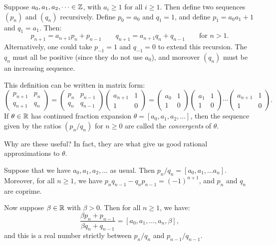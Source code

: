 \documentclass{article}
\begin{document}
\begin{definition}[Convergents]
	\label{convergents-definition}
    Suppose $a_0, a_1, a_2, \dots \in \mathbb{Z}$, with $a_i \geq 1$ for all $i \geq 1$. Then define two sequences $(p_n)$ and $(q_n)$ recursively. Define $p_0 = a_0$ and $q_1 = 1$, and define $p_1 = a_0a_1 + 1$ and $q_1 = a_1$. Then:
    \[
	p_{n+1} = a_{n + 1}p_n + p_{n-1} \qquad q_{n+1} = a_{n+1}q_{n} + q_{n-1} \qquad \text{for } n > 1.
	\]
	Alternatively, one could take $p_{-1} = 1$ and $q_{-1} = 0$ to extend this recursion. The $q_n$ must all be positive (since they do not use $a_0$), and moreover $(q_n)$ must be an increasing sequence.
	
	This definition can be written in matrix form:
	\[
	\begin{pmatrix}
		p_{n+1} & p_n \\ q_{n+1} & q_n
	\end{pmatrix}
	=
	\begin{pmatrix}
		p_n & p_{n-1} \\ q_n & q_{n-1}
	\end{pmatrix}
	\begin{pmatrix}
		a_{n+1} & 1 \\ 1 & 0
	\end{pmatrix}
	=
	\begin{pmatrix}
		a_0 & 1 \\ 1 & 0
	\end{pmatrix}
	\begin{pmatrix}
		a_1 & 1 \\ 1 & 0
	\end{pmatrix}
	\cdots
	\begin{pmatrix}
		a_{n+1} & 1 \\ 1 & 0
	\end{pmatrix}.
	\]
	If $\theta \in \mathbb{R}$ has continued fraction expansion $\theta = [a_0, a_1, a_2, \dots]$, then the sequence given by the ratios $(p_n/q_n)$ for $n \geq 0$ are called the \textit{convergents} of $\theta$.
\end{definition}

Why are these useful? In fact, they are what give us good rational approximations to $\theta$.

\begin{proposition}[Convergents]
	\label{proposition-on-convergents}
    Suppose that we have $a_0, a_1, a_2, \dots$ as usual. Then $p_n/q_n = [a_0, a_1, \dots a_n]$. Moreover, for all $n \geq 1$, we have $p_n q_{n-1} - q_n p_{n-1} = (-1)^{n+1}$, and $p_n$ and $q_n$ are coprime.
    
    Now suppose $\beta \in \mathbb{R}$ with $\beta > 0$. Then for all $n \geq 1$, we have:
    \[
	\frac{\beta p_n + p_{n-1}}{\beta q_n + q_{n-1}} = [a_0, a_1, \dots, a_n, \beta],
	\]
	and this is a real number strictly between $p_n/q_n$ and $p_{n-1}/q_{n-1}$.
\end{proposition}
\end{document}
